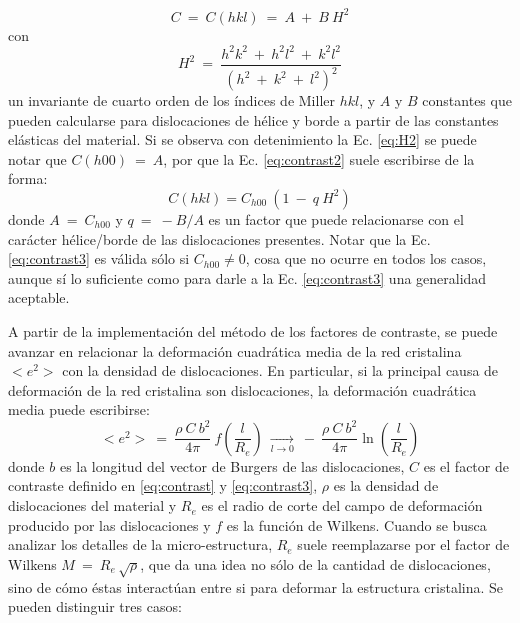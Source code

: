 \begin{equation}
  C \ = \ C(hkl) \ = \ A \ + \ B \ H^2
  \label{eq:contrast2}
\end{equation}
\noindent
con
\begin{equation}
  H^2 \ = \ \frac{h^2k^2 \ + \ h^2l^2 \ + \ k^2l^2}{(h^2 \ + \ k^2 \ + \ l^2)^2}
  \label{eq:H2}
\end{equation}
\noindent
un invariante de cuarto orden de los índices de Miller $hkl$, y $A$ y $B$ constantes que pueden calcularse para dislocaciones de hélice y borde a partir de las constantes elásticas del material.
Si se observa con detenimiento la Ec. \ref{eq:H2} se puede notar que $C(h00) \ = \ A$, por que la Ec. \ref{eq:contrast2} suele escribirse de la forma:
\begin{equation}
  C(hkl) = C_{h00}\ (1 \ - \ q\ H^2)
  \label{eq:contrast3}
\end{equation}
\noindent
donde $A \ = \ C_{h00}$ y $q \ = \ -B/A$ es un factor que puede relacionarse con el carácter hélice/borde de las dislocaciones presentes.
Notar que la Ec. \ref{eq:contrast3} es válida sólo si $C_{h00} \neq 0$, cosa que no ocurre en todos los casos, aunque sí lo suficiente como para darle a la Ec. \ref{eq:contrast3} una generalidad aceptable.

A partir de la implementación del método de los factores de contraste, se puede avanzar en relacionar la deformación cuadrática media de la red cristalina $<e^2>$ con la densidad de dislocaciones. En particular, si la principal causa de deformación de la red cristalina son dislocaciones, la deformación cuadrática media puede escribirse\cite{Wilkens1970}:
\begin{equation}
  <e^2> \ = \ \frac{\rho \ C \ b^2}{4 \pi} \ f\left(\frac{l}{R_e}\right) \ \xrightarrow[l \to 0]{} \ - \ \frac{\rho \ C \ b^2}{4 \pi} \ln \left(\frac{l}{R_e}\right)
  \label{eq:Wilkens}
\end{equation}
\noindent
donde $b$ es la longitud del vector de Burgers de las dislocaciones, $C$ es el factor de contraste definido en \ref{eq:contrast} y \ref{eq:contrast3}, $\rho$ es la densidad de dislocaciones del material y $R_e$ es el radio de corte del campo de deformación producido por las dislocaciones y $f$ es la función de Wilkens. 
Cuando se busca analizar los detalles de la micro-estructura, $R_e$ suele reemplazarse por el factor de Wilkens $M \ = \ R_e\,\sqrt{\rho}$, que da una idea no sólo de la cantidad de dislocaciones, sino de cómo éstas interactúan entre si para deformar la estructura cristalina. Se pueden distinguir tres casos\cite{Kerber2011}:

